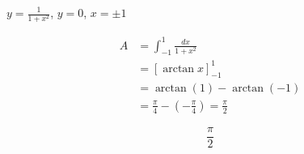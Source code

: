 $y=\frac{1}{1+x^2}$, $y=0$, $x=\pm1$

\nopagebreak
\begin{align*}
A &= \int_{-1}^{1} \frac{dx}{1+x^2} \\
&= [\arctan x]_{-1}^{1} \\
&= \arctan(1) - \arctan(-1) \\
&= \frac{\pi}{4} - (-\frac{\pi}{4}) = \frac{\pi}{2}
\end{align*}

\[
\boxed{\displaystyle \frac{\pi}{2}}
\]
